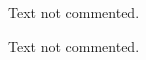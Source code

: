 \documentclass{article}
\begin{document}
Text not commented.
\par
Text not commented.
\par
\blindtext
\par
\begin{comment}
\blindtext
\end{comment}
\end{document}
